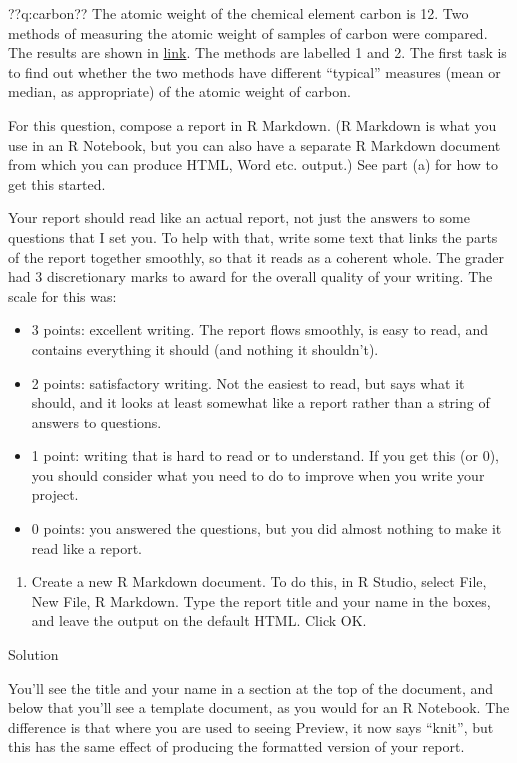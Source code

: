 \documentclass[]{tufte-book}
\providecommand{\tightlist}{%
  \setlength{\itemsep}{0pt}\setlength{\parskip}{0pt}}
\theoremstyle{definition}
\theoremstyle{definition}
\theoremstyle{definition}
\theoremstyle{remark}
\begin{document}
??q:carbon?? The atomic weight of the chemical element carbon is 12. Two
methods of measuring the atomic weight of samples of carbon were
compared. The results are shown in
\href{http://www.utsc.utoronto.ca/~butler/c32/carbon.txt}{link}. The
methods are labelled 1 and 2. The first task is to find out whether the
two methods have different ``typical'' measures (mean or median, as
appropriate) of the atomic weight of carbon.

For this question, compose a report in R Markdown. (R Markdown is what
you use in an R Notebook, but you can also have a separate R Markdown
document from which you can produce HTML, Word etc. output.) See part
(a) for how to get this started.

Your report should read like an actual report, not just the answers to
some questions that I set you. To help with that, write some text that
links the parts of the report together smoothly, so that it reads as a
coherent whole. The grader had 3 discretionary marks to award for the
overall quality of your writing. The scale for this was:

\begin{itemize}
\item
  3 points: excellent writing. The report flows smoothly, is easy to
  read, and contains everything it should (and nothing it shouldn't).
\item
  2 points: satisfactory writing. Not the easiest to read, but says what
  it should, and it looks at least somewhat like a report rather than a
  string of answers to questions.
\item
  1 point: writing that is hard to read or to understand. If you get
  this (or 0), you should consider what you need to do to improve when
  you write your project.
\item
  0 points: you answered the questions, but you did almost nothing to
  make it read like a report.
\end{itemize}

\begin{enumerate}
\def\labelenumi{(\alph{enumi})}
\tightlist
\item
  Create a new R Markdown document. To do this, in R Studio, select
  File, New File, R Markdown. Type the report title and your name in the
  boxes, and leave the output on the default HTML. Click OK.
\end{enumerate}

Solution

You'll see the title and your name in a section at the top of the
document, and below that you'll see a template document, as you would
for an R Notebook. The difference is that where you are used to seeing
Preview, it now says ``knit'', but this has the same effect of producing
the formatted version of your report.
\end{document}
